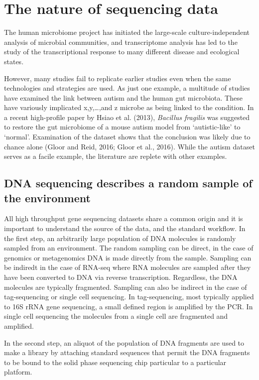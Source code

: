 \documentclass[twocolumn]{article}
\begin{document}
\section{The nature of sequencing
data}\label{the-nature-of-sequencing-data}

The human microbiome project has initiated the large-scale
culture-independent analysis of microbial communities, and transcriptome
analysis has led to the study of the transcriptional response to many
different disease and ecological states.

However, many studies fail to replicate earlier studies even when the
same technologies and strategies are used. As just one example, a
multitude of studies have examined the link between autism and the human
gut microbiota. These have variously implicated x,y,\ldots{},and z
microbe as being linked to the condition. In a recent high-profile paper
by Hsiao et al. (2013), \emph{Bacillus fragilis} was suggested to
restore the gut microbiome of a mouse autism model from `autistic-like'
to `normal'. Examination of the dataset shows that the conclusion was
likely due to chance alone (Gloor and Reid, 2016; Gloor et al., 2016).
While the autism dataset serves as a facile example, the literature are
replete with other examples.

\subsection{DNA sequencing describes a random sample of the
environment}\label{dna-sequencing-describes-a-random-sample-of-the-environment}

All high throughput gene sequencing datasets share a common origin and
it is important to understand the source of the data, and the standard
workflow. In the first step, an arbitrarily large population of DNA
molecules is randomly sampled from an environment. The random sampling
can be direct, in the case of genomics or metagenomics DNA is made
directly from the sample. Sampling can be indiredt in the case of
RNA-seq where RNA molecules are sampled after they have been converted
to DNA via reverse transcription. Regardless, the DNA molecules are
typically fragmented. Sampling can also be indirect in the case of
tag-sequencing or single cell sequencing. In tag-sequencing, most
typically applied to 16S rRNA gene sequencing, a small defined region is
amplified by the PCR. In single cell sequencing the molecules from a
single cell are fragmented and amplified.

In the second step, an aliquot of the population of DNA fragments are
used to make a library by attaching standard sequences that permit the
DNA fragments to be bound to the solid phase sequencing chip particular
to a particular platform.
\end{document}
